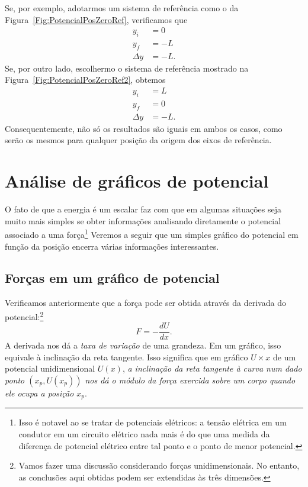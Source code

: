 Se, por exemplo, adotarmos um sistema de referência como o da Figura~\ref{Fig:PotencialPosZeroRef}, verificamos que
\begin{align}
    y_i &= 0 \\
    y_f &= -L \\
    \Delta y &= -L.
\end{align}
%
Se, por outro lado, escolhermo o sistema de referência mostrado na Figura~\ref{Fig:PotencialPosZeroRef2}, obtemos
\begin{align}
    y_i &= L \\
    y_f &= 0 \\
    \Delta y &= -L.
\end{align}
%
Consequentemente, não só os resultados são iguais em ambos os casos, como serão os mesmos para qualquer posição da origem dos eixos de referência.


\section{Análise de gráficos de potencial}

O fato de que a energia é um escalar faz com que em algumas situações seja muito mais simples se obter informações analisando diretamente o potencial associado a uma força\footnote[][-4cm]{Isso é notavel ao se tratar de potenciais elétricos: a tensão elétrica em um condutor em um circuito elétrico nada mais é do que uma medida da diferença de potencial elétrico entre tal ponto e o ponto de menor potencial.} Veremos a seguir que um simples gráfico do potencial em função da posição encerra várias informações interessantes.

\subsection{Forças em um gráfico de potencial}

Verificamos anteriormente que a força pode ser obtida através da derivada do potencial:\footnote[][-4cm]{Vamos fazer uma discussão considerando forças unidimensionais. No entanto, as conclusões aqui obtidas podem ser extendidas às três dimensões.}
\begin{equation*}
    F = -\frac{dU}{dx}.
\end{equation*}
%
A derivada nos dá a \emph{taxa de variação} de uma grandeza. Em um gráfico, isso equivale à inclinação da reta tangente. Isso significa que em gráfico $U \times x$ de um potencial unidimensional $U(x)$, \emph{a inclinação da reta tangente à curva num dado ponto $(x_p, U(x_p))$ nos dá o módulo da força exercida sobre um corpo quando ele ocupa a posição $x_p$}.

